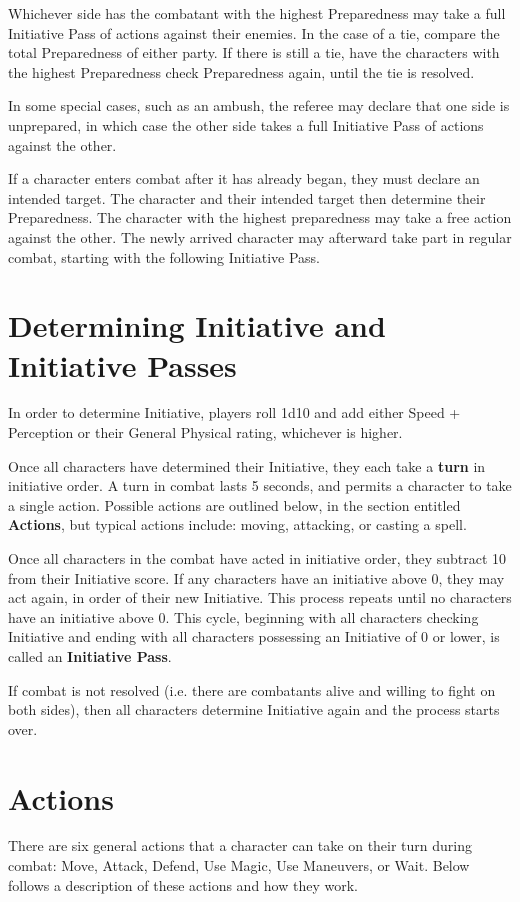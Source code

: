 \documentclass[oneside]{book}
\begin{document}
\begin{multicols}{2}
Whichever side has the combatant with the highest Preparedness may take a full Initiative Pass of actions against their enemies. In the case of a tie, compare the total Preparedness of either party. If there is still a tie, have the characters with the highest Preparedness check Preparedness again, until the tie is resolved.

In some special cases, such as an ambush, the referee may declare that one side is unprepared, in which case the other side takes a full Initiative Pass of actions against the other. 

If a character enters combat after it has already began, they must declare an intended target. The character and their intended target then determine their Preparedness. The character with the highest preparedness may take a free action against the other. The newly arrived character may afterward take part in regular combat, starting with the following Initiative Pass.

\section{Determining Initiative and Initiative Passes}
In order to determine Initiative, players roll 1d10 and add either Speed + Perception or their General Physical rating, whichever is higher.

Once all characters have determined their Initiative, they each take a 
\textbf{turn} in initiative order. A turn in combat lasts 5 seconds, and permits a character to take a single action. Possible actions are outlined below, in the section entitled \textbf{Actions}, but typical actions include: moving, attacking, or casting a spell. 

Once all characters in the combat have acted in initiative order, they subtract 10 from their Initiative score. If any characters have an initiative above 0, they may act again, in order of their new Initiative. This process repeats until no characters have an initiative  above 0. This cycle, beginning with all characters checking Initiative and ending with all characters possessing an Initiative of 0 or lower, is called an \textbf{Initiative Pass}. 

If combat is not resolved (i.e. there are combatants alive and willing to fight on both sides), then all characters determine Initiative again and the process starts over. 

\section{Actions}
There are six general actions that a character can take on their turn during combat: Move, Attack, Defend, Use Magic, Use Maneuvers, or Wait. Below follows a description of these actions and how they work. 


\end{multicols}
\end{document}
